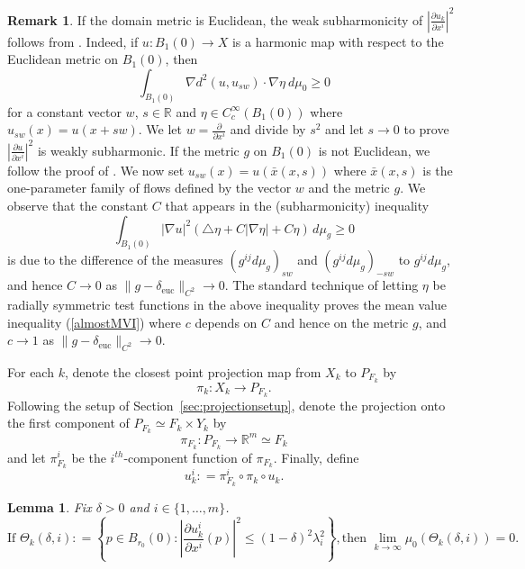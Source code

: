 \documentclass[12pt]{amsart}
\newtheorem{lemma}[theorem]{Lemma}
\theoremstyle{definition}
\newtheorem{remark}[theorem]{Remark}
\numberwithin{equation}{section}
\newcommand{\R}{\mathbb R}
\newcommand{\deltae}{\delta_{\text{euc}}}
\newcommand{\PFk}{P_{F_k}}
\begin{document}
\begin{remark}  \label{re:thm2.4.6}
If the domain metric  is Euclidean, the weak subharmonicity of $\left|\frac{\partial u_k}{\partial x^i} \right|^2$ follows from  \cite[Remark 2.4.3]{korevaar-schoen1}.  Indeed, if $u:B_1(0) \rightarrow X$ is a harmonic map with respect to the Euclidean metric on $B_1(0)$, then
 $$
 \int_{B_1(0)} \nabla d^2 (u,u_{sw}) \cdot \nabla \eta \ d\mu_0\geq 0
 $$ 
 for a constant vector $w$, $s \in \R$ and $\eta \in C^\infty_c(B_1(0))$ where $u_{sw}(x)=u(x+sw)$.  We let $w=\frac{\partial}{\partial x^i}$ and divide by $s^2$ and let $s \rightarrow 0$ to prove $\left|\frac{\partial u}{\partial x^i} \right|^2$ is weakly subharmonic.  If the metric  $g$ on $B_1(0)$ is not Euclidean, we  follow the proof of \cite[Theorem 2.4.6]{korevaar-schoen1}.  We now set $u_{sw}(x)=u(\bar x(x,s))$ where  $\bar x(x,s)$ is the one-parameter family of flows defined by the vector $w$ and the metric $g$.  We observe that the constant $C$ that appears in the (subharmonicity) inequality \cite[(2.4.xxv)]{korevaar-schoen1}
 \[
 \int_{B_1(0)} |\nabla u |^2 (\triangle \eta + C |\nabla \eta| + C\eta) \, d\mu_g \geq 0
 \]
is due to the difference of the measures  $(g^{ij} d\mu_g)_{sw}$ and $(g^{ij} d\mu_g)_{-sw}$ to $g^{ij} d\mu_g$, and hence $C \rightarrow 0$ as $\|g -\deltae\|_{C^2} \rightarrow 0$.
The  standard  technique of letting $\eta$ be radially symmetric test functions in the above inequality proves the mean value inequality (\ref{almostMVI}) where $c$ depends on $C$ and hence on the metric $g$, and   $c \rightarrow 1$ as $\|g -\deltae\|_{C^2} \rightarrow 0$.\end{remark}



For each $k$,
 denote the closest point projection map from $X_k$ to $\PFk$ by
  \[
 \pi_k: X_k \rightarrow \PFk.
\]
Following the setup of Section~\ref{sec:projectionsetup}, denote the projection onto the first component of $\PFk \simeq F_k \times Y_k$ by
\[
\pi_{F_k}:  \PFk\rightarrow \R^m \simeq F_k
\]
and let $\pi_{F_k}^i$ be the $i^{th}$-component function of $\pi_{F_k}$. Finally, define
\[
u_k^i : = \pi^i_{F_k} \circ  \pi_k \circ u_k.
\]

\begin{lemma} \label{omega*}
Fix  $\delta>0$ and $i\in \{1, \dots, m\}$. 
\[
\mbox{If }
\Theta_k(\delta, i): =\left\{ p \in B_{r_0}(0):   \left|\frac{\partial u_k^i}{\partial x^i}(p) \right|^2 \leq  (1-\delta)^2\lambda_i^2 \right\}, 
\mbox{
then } 
\lim_{k\to\infty}\mu_0(\Theta_k(\delta, i))=0. 
\]
\end{lemma}
\end{document}
